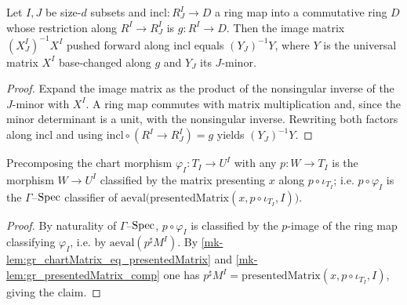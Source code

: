 \begin{lemma}\label{mk-lem:gr_imageMatrix_map_ringHom}
  \leanok

  Let \(I, J\) be size-\(d\) subsets and \(\mathrm{incl} : R^I_J \to D\) a ring map into a
  commutative ring \(D\) whose restriction along \(R^I \to R^I_J\) is \(g : R^I \to D\). Then
  the image matrix \((X^I_J)^{-1}X^I\) pushed forward along \(\mathrm{incl}\) equals
  \((Y_J)^{-1}Y\), where \(Y\) is the universal matrix \(X^I\) base-changed along \(g\) and
  \(Y_J\) its \(J\)-minor.
\end{lemma}
\begin{proof}

  Expand the image matrix as the product of the nonsingular inverse of the \(J\)-minor with
  \(X^I\). A ring map commutes with matrix multiplication and, since the minor determinant is
  a unit, with the nonsingular inverse. Rewriting both factors along \(\mathrm{incl}\) and
  using \(\mathrm{incl}\circ(R^I\to R^I_J) = g\) yields \((Y_J)^{-1}Y\).
\end{proof}

\begin{lemma}\label{mk-lem:gr_comp_chartMorphism}
  \leanok

  Precomposing the chart morphism \(\varphi_I : T_I \to U^I\) with any \(p : W \to T_I\) is
  the morphism \(W \to U^I\) classified by the matrix presenting \(x\) along
  \(p\circ\iota_{T_I}\); i.e. \(p \circ \varphi_I\) is the \(\Gamma\)--\(\operatorname{Spec}\) classifier of
  \(\mathrm{aeval}\bigl(\mathrm{presentedMatrix}(x, p\circ\iota_{T_I}, I)\bigr)\).
\end{lemma}
\begin{proof}
  By naturality of \(\Gamma\)--\(\operatorname{Spec}\), \(p\circ\varphi_I\) is classified by the \(p\)-image
  of the ring map classifying \(\varphi_I\), i.e. by \(\mathrm{aeval}(p^{\sharp}M^I)\). By
  \ref{mk-lem:gr_chartMatrix_eq_presentedMatrix} and \ref{mk-lem:gr_presentedMatrix_comp} one has
  \(p^{\sharp}M^I = \mathrm{presentedMatrix}(x, p\circ\iota_{T_I}, I)\), giving the claim.
\end{proof}

